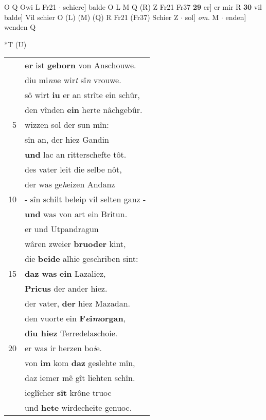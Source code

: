 \documentclass[8pt,a4paper,notitlepage]{article}
\begin{document}
\begin{table}[ht]
\begin{minipage}[t]{0.5\linewidth}
O Q Owi L Fr21  $\cdot$ schiere] balde O L M Q (R) Z Fr21 Fr37 \textbf{29} er] er mir R \textbf{30} vil balde] Vil schier O (L) (M) (Q) R Fr21 (Fr37) Schier Z  $\cdot$ sol] \textit{om.} M  $\cdot$ enden] wenden Q \newline
\end{minipage}
\hspace{0.5cm}
\begin{minipage}[t]{0.5\linewidth}
\small
\begin{center}*T (U)
\end{center}
\begin{tabular}{rl}
 & \textbf{er} ist \textbf{geborn} von Anschouwe.\\ 
 & diu mi\textit{nn}e wir\textit{t} sî\textit{n} vrouwe.\\ 
 & sô wirt \textbf{iu} er an strîte ein schûr,\\ 
 & den vînden \textbf{ein} herte nâchgebûr.\\ 
5 & wizzen sol der sun mîn:\\ 
 & sîn an, der hiez Gandin\\ 
 & \textbf{und} lac an ritterschefte tôt.\\ 
 & des vater leit die selbe nôt,\\ 
 & der was ge\textit{h}eizen Andanz\\ 
10 & - sîn schilt beleip vil selten ganz -\\ 
 & \textbf{und} was von art ein Britun.\\ 
 & er und Utpandragun\\ 
 & wâren zweier \textbf{bruoder} kint,\\ 
 & die \textbf{beide} alhie geschriben sint:\\ 
15 & \textbf{daz was} \textbf{ein} Lazaliez,\\ 
 & \textbf{Pricus} der ander hiez.\\ 
 & der vater, \textbf{der} hiez Mazadan.\\ 
 & den vuorte ein \textbf{F\textit{e}i\textit{m}organ},\\ 
 & \textbf{diu hiez} Terredelaschoie.\\ 
20 & er was ir herzen bo\textit{i}e.\\ 
 & von \textbf{im} kom \textbf{daz} geslehte mîn,\\ 
 & daz iemer mê gît liehten schîn.\\ 
 & ieglîcher \textbf{sît} krône truoc\\ 
 & und \textbf{hete} wirdecheite genuoc.\\ 

\end{tabular}
\end{minipage}
\end{table}
\end{document}
